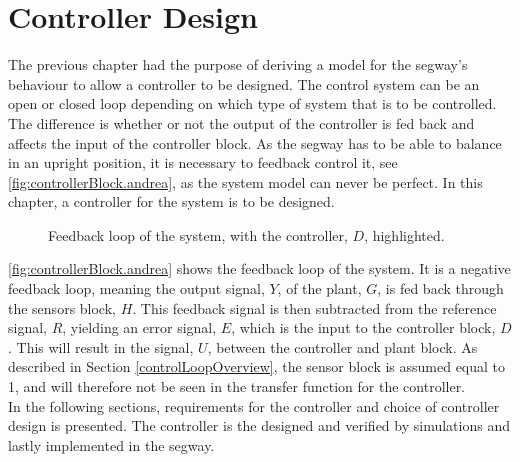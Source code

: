 \chapter{Controller Design}\label{ch:Controller}
The previous chapter had the purpose of deriving a model for the segway's behaviour to allow a controller to be designed. The control system can be an open or closed loop depending on which type of system that is to be controlled. The difference is whether or not the output of the controller is fed back and affects the input of the controller block. As the segway has to be able to balance in an upright position, it is necessary to feedback control it, see \autoref{fig:controllerBlock.andrea}, as the system model can never be perfect. In this chapter, a controller for the system is to be designed.\vspace{-0.5 cm}
\begin{figure}[H]
\centering
\scalebox{0.8}{
}
\caption{Feedback loop of the system, with the controller, $D$, highlighted.}
\label{fig:controllerBlock.andrea}
\end{figure}
\vspace{-0.7 cm}
\autoref{fig:controllerBlock.andrea} shows the feedback loop of the system. It is a negative feedback loop, meaning the output signal, $Y$, of the plant, $G$, is fed back through the sensors block, $H$. This feedback signal is then subtracted from the reference signal, $R$, yielding an error signal, $E$, which is the input to the controller block, $D$. This will result in the signal, $U$, between the controller and plant block. As described in Section \ref{controlLoopOverview}, the sensor block is assumed equal to 1, and will therefore not be seen in the transfer function for the controller.
\\In the following sections, requirements for the controller and choice of controller design is presented. The controller is the designed and verified by simulations and lastly implemented in the segway.


%